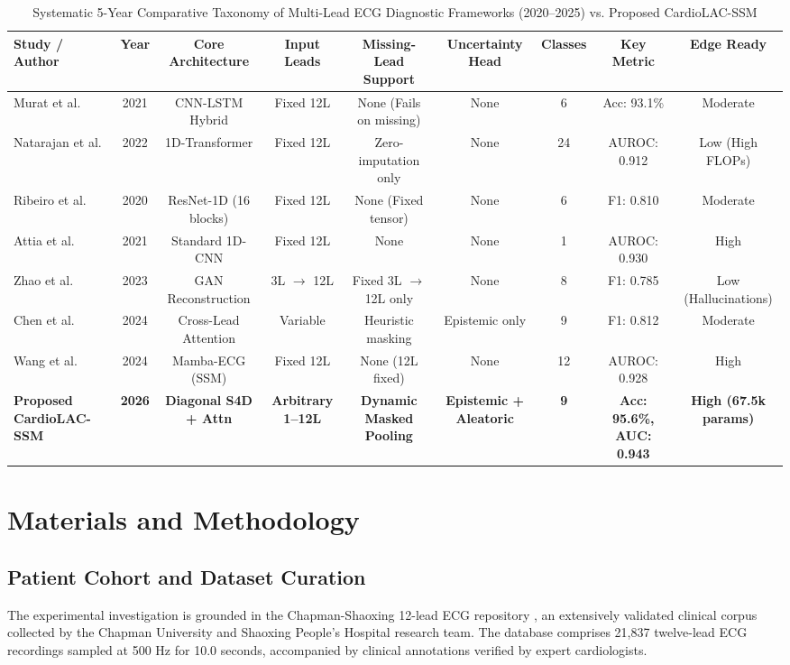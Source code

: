 \documentclass[journal,11pt,draftclsnofoot,onecolumn]{IEEEtran}
\begin{document}
\begin{table}[!t]
\caption{Systematic 5-Year Comparative Taxonomy of Multi-Lead ECG Diagnostic Frameworks (2020--2025) vs. Proposed CardioLAC-SSM}
\label{tab_lit_comparison}
\centering
\begin{tabularx}{\textwidth}{lcccccccc}
\toprule
\textbf{Study / Author} & \textbf{Year} & \textbf{Core Architecture} & \textbf{Input Leads} & \textbf{Missing-Lead Support} & \textbf{Uncertainty Head} & \textbf{Classes} & \textbf{Key Metric} & \textbf{Edge Ready} \\
\midrule
Murat et al. \cite{ref_7} & 2021 & CNN-LSTM Hybrid & Fixed 12L & None (Fails on missing) & None & 6 & Acc: 93.1\% & Moderate \\
Natarajan et al. \cite{ref_8} & 2022 & 1D-Transformer & Fixed 12L & Zero-imputation only & None & 24 & AUROC: 0.912 & Low (High FLOPs) \\
Ribeiro et al. \cite{ref_9} & 2020 & ResNet-1D (16 blocks) & Fixed 12L & None (Fixed tensor) & None & 6 & F1: 0.810 & Moderate \\
Attia et al. \cite{ref_10} & 2021 & Standard 1D-CNN & Fixed 12L & None & None & 1 & AUROC: 0.930 & High \\
Zhao et al. \cite{ref_25} & 2023 & GAN Reconstruction & 3L $\to$ 12L & Fixed 3L $\to$ 12L only & None & 8 & F1: 0.785 & Low (Hallucinations) \\
Chen et al. \cite{ref_26} & 2024 & Cross-Lead Attention & Variable & Heuristic masking & Epistemic only & 9 & F1: 0.812 & Moderate \\
Wang et al. \cite{ref_28} & 2024 & Mamba-ECG (SSM) & Fixed 12L & None (12L fixed) & None & 12 & AUROC: 0.928 & High \\
\midrule
\textbf{Proposed CardioLAC-SSM} & \textbf{2026} & \textbf{Diagonal S4D + Attn} & \textbf{Arbitrary 1--12L} & \textbf{Dynamic Masked Pooling} & \textbf{Epistemic + Aleatoric} & \textbf{9} & \textbf{Acc: 95.6\%, AUC: 0.943} & \textbf{High (67.5k params)} \\
\bottomrule
\end{tabularx}
\end{table}

\section{Materials and Methodology}
\subsection{Patient Cohort and Dataset Curation}
The experimental investigation is grounded in the Chapman-Shaoxing 12-lead ECG repository \cite{ref_32,ref_33}, an extensively validated clinical corpus collected by the Chapman University and Shaoxing People's Hospital research team. The database comprises 21,837 twelve-lead ECG recordings sampled at 500 Hz for 10.0 seconds, accompanied by clinical annotations verified by expert cardiologists.
\end{document}
